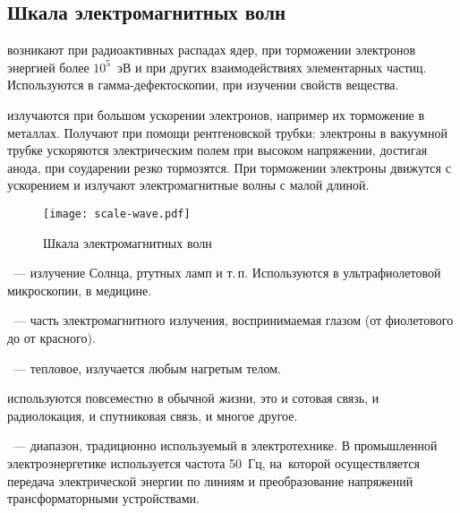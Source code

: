 \subsection{Шкала электромагнитных волн}


 возникают при радиоактивных распадах ядер, при торможении электронов энергией более $10^5$~эВ и при других взаимодействиях элементарных частиц. Используются в гамма-дефектоскопии, при изучении свойств вещества.

 излучаются при большом ускорении электронов, например их торможение в металлах. Получают при помощи рентгеновской трубки: электроны в вакуумной трубке ускоряются электрическим полем при высоком напряжении, достигая анода, при со­ударении резко тормозятся. При торможении электроны движут­ся с ускорением и излучают электромагнитные волны с малой длиной. 

\begin{figure}[!h]
\centering
\texttt{[image: scale-wave.pdf]}
\caption{Шкала электромагнитных волн}
\end{figure}
~--- излучение Солнца, ртутных ламп и т.\,п. Используются в ультрафиолетовой микроскопии, в медицине.

~--- часть электромагнитного излучения, воспринимаемая глазом (от фиолетового до от красного).

~--- тепловое, излучается любым нагретым телом.

 используются повсеместно в обычной жизни, это и сотовая связь, и радиолокация, и спутниковая связь, и многое другое.

~--- диапазон, традиционно используемый в электротехнике. В промышленной электроэнергетике используется частота 50~Гц, на~которой осуществляется передача электрической энергии по линиям и преобразование напряжений трансформаторными устройствами.